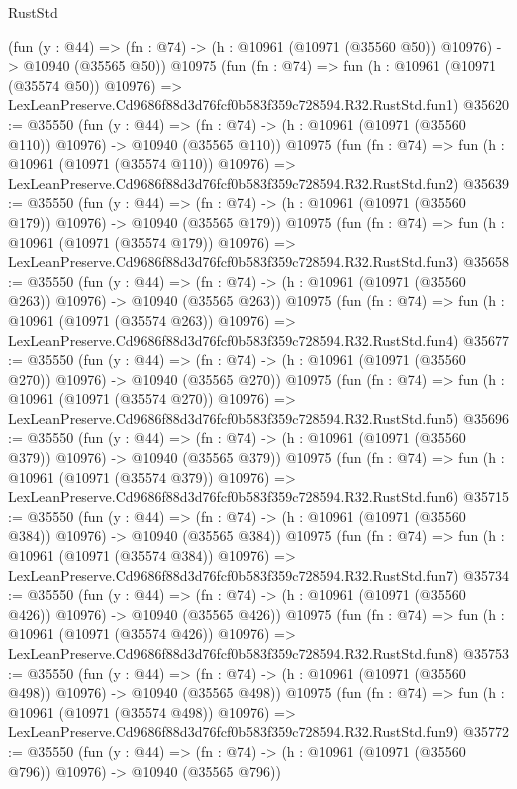 \begin{lexlean}{RustStd}
\begin{coremodule}
    (fun (y : @44) =>
    (fn : @74) -> (h : @10961 (@10971 (@35560 @50)) @10976) -> @10940 (@35565 @50))
    @10975
    (fun (fn : @74) =>
    fun (h : @10961 (@10971 (@35574 @50)) @10976) =>
    LexLeanPreserve.Cd9686f88d3d76fcf0b583f359c728594.R32.RustStd.fun1)
@35620 := @35550
    (fun (y : @44) =>
    (fn : @74) -> (h : @10961 (@10971 (@35560 @110)) @10976) -> @10940 (@35565 @110))
    @10975
    (fun (fn : @74) =>
    fun (h : @10961 (@10971 (@35574 @110)) @10976) =>
    LexLeanPreserve.Cd9686f88d3d76fcf0b583f359c728594.R32.RustStd.fun2)
@35639 := @35550
    (fun (y : @44) =>
    (fn : @74) -> (h : @10961 (@10971 (@35560 @179)) @10976) -> @10940 (@35565 @179))
    @10975
    (fun (fn : @74) =>
    fun (h : @10961 (@10971 (@35574 @179)) @10976) =>
    LexLeanPreserve.Cd9686f88d3d76fcf0b583f359c728594.R32.RustStd.fun3)
@35658 := @35550
    (fun (y : @44) =>
    (fn : @74) -> (h : @10961 (@10971 (@35560 @263)) @10976) -> @10940 (@35565 @263))
    @10975
    (fun (fn : @74) =>
    fun (h : @10961 (@10971 (@35574 @263)) @10976) =>
    LexLeanPreserve.Cd9686f88d3d76fcf0b583f359c728594.R32.RustStd.fun4)
@35677 := @35550
    (fun (y : @44) =>
    (fn : @74) -> (h : @10961 (@10971 (@35560 @270)) @10976) -> @10940 (@35565 @270))
    @10975
    (fun (fn : @74) =>
    fun (h : @10961 (@10971 (@35574 @270)) @10976) =>
    LexLeanPreserve.Cd9686f88d3d76fcf0b583f359c728594.R32.RustStd.fun5)
@35696 := @35550
    (fun (y : @44) =>
    (fn : @74) -> (h : @10961 (@10971 (@35560 @379)) @10976) -> @10940 (@35565 @379))
    @10975
    (fun (fn : @74) =>
    fun (h : @10961 (@10971 (@35574 @379)) @10976) =>
    LexLeanPreserve.Cd9686f88d3d76fcf0b583f359c728594.R32.RustStd.fun6)
@35715 := @35550
    (fun (y : @44) =>
    (fn : @74) -> (h : @10961 (@10971 (@35560 @384)) @10976) -> @10940 (@35565 @384))
    @10975
    (fun (fn : @74) =>
    fun (h : @10961 (@10971 (@35574 @384)) @10976) =>
    LexLeanPreserve.Cd9686f88d3d76fcf0b583f359c728594.R32.RustStd.fun7)
@35734 := @35550
    (fun (y : @44) =>
    (fn : @74) -> (h : @10961 (@10971 (@35560 @426)) @10976) -> @10940 (@35565 @426))
    @10975
    (fun (fn : @74) =>
    fun (h : @10961 (@10971 (@35574 @426)) @10976) =>
    LexLeanPreserve.Cd9686f88d3d76fcf0b583f359c728594.R32.RustStd.fun8)
@35753 := @35550
    (fun (y : @44) =>
    (fn : @74) -> (h : @10961 (@10971 (@35560 @498)) @10976) -> @10940 (@35565 @498))
    @10975
    (fun (fn : @74) =>
    fun (h : @10961 (@10971 (@35574 @498)) @10976) =>
    LexLeanPreserve.Cd9686f88d3d76fcf0b583f359c728594.R32.RustStd.fun9)
@35772 := @35550
    (fun (y : @44) =>
    (fn : @74) -> (h : @10961 (@10971 (@35560 @796)) @10976) -> @10940 (@35565 @796))

\end{coremodule}
\end{lexlean}
